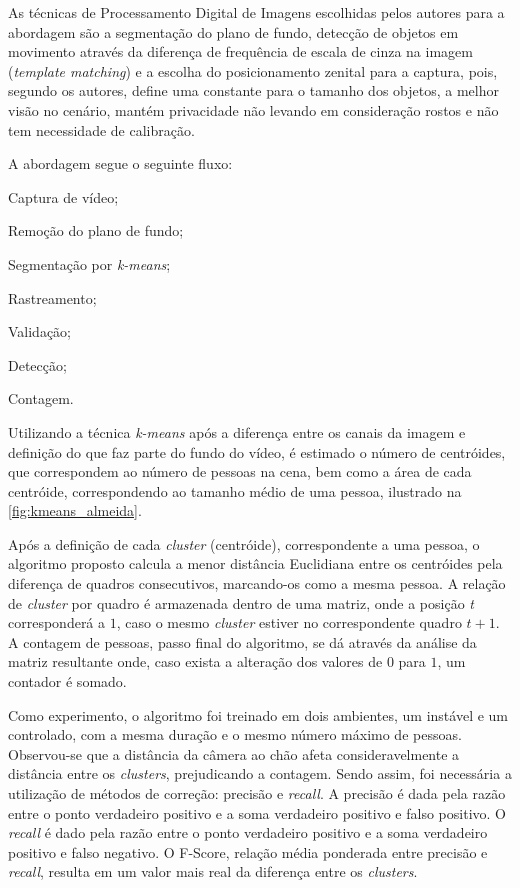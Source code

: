 \documentclass[12pt,oneside,a4paper,chapter=TITLE,section=TITLE,sumario=tradicional]{abntex2}
\begin{document}
As técnicas de Processamento Digital de Imagens escolhidas pelos autores para a abordagem são a segmentação do plano de fundo, detecção de objetos em movimento através da diferença de frequência de escala de cinza na imagem (\textit{template matching}) e a escolha do posicionamento zenital para a captura, pois, segundo os autores, define uma constante para o tamanho dos objetos, a melhor visão no cenário, mantém privacidade não levando em consideração rostos e não tem necessidade de calibração.

A abordagem segue o seguinte fluxo:
\begin{lista}
    \item Captura de vídeo;
    \item Remoção do plano de fundo;
    \item Segmentação por \textit{k-means};
    \item Rastreamento;
    \item Validação;
    \item Detecção;
    \item Contagem.
\end{lista}

Utilizando a técnica \textit{k-means} após a diferença entre os canais da imagem e definição do que faz parte do fundo do vídeo, é estimado o número de centróides, que correspondem ao número de pessoas na cena, bem como a área de cada centróide, correspondendo ao tamanho médio de uma pessoa, ilustrado na \autoref{fig:kmeans_almeida}.

\begin{figure}[htb]
\end{figure}

Após a definição de cada \textit{cluster} (centróide), correspondente a uma pessoa, o algoritmo proposto calcula a menor distância Euclidiana entre os centróides pela diferença de quadros consecutivos, marcando-os como a mesma pessoa.
A relação de \textit{cluster} por quadro é armazenada dentro de uma matriz, onde a posição \textit{t} corresponderá a $1$, caso o mesmo \textit{cluster} estiver no correspondente quadro $t+1$. A contagem de pessoas, passo final do algoritmo, se dá através da análise da matriz resultante onde, caso exista a alteração dos valores de $0$ para $1$, um contador é somado.

Como experimento, o algoritmo foi treinado em dois ambientes, um instável e um controlado, com a mesma duração e o mesmo número máximo de pessoas. Observou-se que a distância da câmera ao chão afeta consideravelmente a distância entre os \textit{clusters}, prejudicando a contagem. Sendo assim, foi necessária a utilização de métodos de correção: precisão e \textit{recall}. A precisão é dada pela razão entre o ponto verdadeiro positivo e a soma verdadeiro positivo e falso positivo. O \textit{recall} é dado pela razão entre o ponto verdadeiro positivo e a soma verdadeiro positivo e falso negativo. O F-Score, relação média ponderada entre precisão e \textit{recall}, resulta em um valor mais real da diferença entre os \textit{clusters}.
\end{document}
